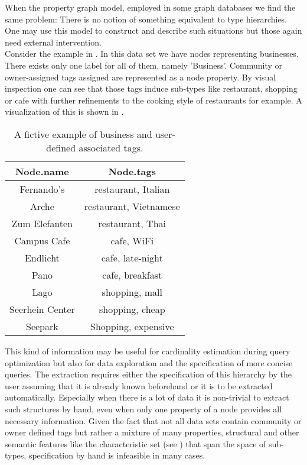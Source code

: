 \noindent When  the property graph model, employed in some graph databases we find the same problem: There is no notion of something equivalent to type hierarchies. One may use this model to construct and describe such situations but those again need external intervention. \\
Consider the example in . In this data set we have nodes representing businesses. There exists only one label for all of them, namely 'Business'. Community or owner-assigned tags assigned are represented as a node property. By visual inspection one can see that those tags induce sub-types like restaurant, shopping or cafe with further refinements to the cooking style of restaurants for example. A visualization of this is shown in .\\
\begin{table}[htp]
     \centering
     \begin{tabular}{c c} \toprule
            Node.name & Node.tags \\ \midrule
            Fernando's & restaurant, Italian \\ 
            Arche & restaurant, Vietnamese \\ 
            Zum Elefanten & restaurant, Thai \\ 
            Campus Cafe & cafe, WiFi \\ 
            Endlicht & cafe, late-night \\ 
            Pano & cafe, breakfast \\
            Lago & shopping, mall \\ 
            Seerhein Center & shopping, cheap \\ 
            Seepark & Shopping, expensive \\ \bottomrule
        \end{tabular}
    \caption{A fictive example of business and user-defined associated tags.}
    \label{tab:ex_1}
\end{table}{}
This kind of information may be useful for cardinality estimation during query optimization but also for data exploration and the specification of more concise queries. The extraction requires either the specification of this hierarchy by the user assuming that it is already known beforehand or it is to be extracted automatically. Especially when there is a lot of data it is non-trivial to extract such structures by hand, even when only one property of a node provides all necessary information. Given the fact that not all data sets contain community or owner defined tags but rather a mixture of many properties, structural and other semantic features like the characteristic set (see ) that span the space of sub-types, specification by hand is infeasible in many cases. \\

